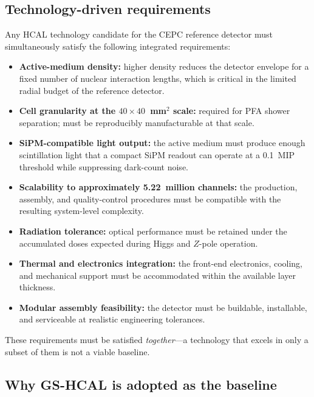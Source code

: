 \subsection{Technology-driven requirements}
\label{subsec:tech-req}

Any HCAL technology candidate for the CEPC reference detector must
simultaneously satisfy the following integrated requirements:

\begin{itemize}
\item \textbf{Active-medium density:} higher density reduces the
  detector envelope for a fixed number of nuclear interaction lengths,
  which is critical in the limited radial budget of the reference
  detector.
\item \textbf{Cell granularity at the $40\times40$~mm$^{2}$ scale:}
  required for PFA shower separation; must be reproducibly
  manufacturable at that scale.
\item \textbf{SiPM-compatible light output:} the active medium must
  produce enough scintillation light that a compact SiPM readout can
  operate at a \SI{0.1}{MIP} threshold while suppressing dark-count
  noise.
\item \textbf{Scalability to approximately 5.22~million channels:} the
  production, assembly, and quality-control procedures must be
  compatible with the resulting system-level complexity.
\item \textbf{Radiation tolerance:} optical performance must be
  retained under the accumulated doses expected during Higgs and
  $Z$-pole operation.
\item \textbf{Thermal and electronics integration:} the front-end
  electronics, cooling, and mechanical support must be accommodated
  within the available layer thickness.
\item \textbf{Modular assembly feasibility:} the detector must be
  buildable, installable, and serviceable at realistic engineering
  tolerances.
\end{itemize}

These requirements must be satisfied \emph{together}---a technology
that excels in only a subset of them is not a viable baseline.

\subsection{Why GS-HCAL is adopted as the baseline}
\label{subsec:why-baseline}


